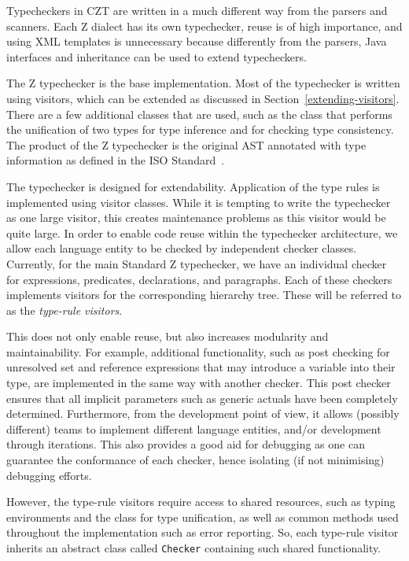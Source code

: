 \documentclass{llncs}
\begin{document}
Typecheckers in CZT are written in a much different way from the parsers
and scanners. Each Z dialect has its own typechecker, reuse
is of high importance, and using XML templates is unnecessary because
differently from the parsers, Java interfaces and inheritance can be used to
extend typecheckers.

The Z typechecker is the base implementation. Most of the typechecker
is written using visitors, which can be extended as discussed in
Section~\ref{extending-visitors}. There are a few additional classes
that are used, such as the class that performs the unification of two
types for type inference and for checking type consistency.
The product of the Z typechecker is the original AST annotated with type
information as defined in the ISO Standard~\cite[Section~10]{isoz}.

The typechecker is designed for extendability. Application of the type
rules is implemented using visitor classes. While it is tempting to
write the typechecker as one large visitor, this creates maintenance
problems as this visitor would be quite large.
In order to enable code reuse within the typechecker architecture, we
allow each language entity to be checked by independent checker classes.
Currently, for the main Standard Z typechecker, we have an individual checker
for expressions, predicates, declarations, and paragraphs. Each of these checkers
implements visitors for the corresponding hierarchy tree.
These will be referred to as the {\em type-rule visitors}.

This does not only enable reuse, but also increases modularity and maintainability.
For example, additional functionality, such as post checking for unresolved set and
reference expressions that may introduce a variable into their type, are implemented in
the same way with another checker. This post checker ensures that all implicit
parameters such as generic actuals have been completely determined.
Furthermore, from the development point of view, it allows (possibly different) teams
to implement different language entities, and/or development through iterations.
This also provides a good aid for debugging as one can guarantee the conformance of each
checker, hence isolating (if not minimising) debugging efforts.

However, the type-rule visitors require access to shared resources,
such as typing environments and the class for type unification, as well as
common methods used throughout the implementation such as error reporting.
So, each type-rule visitor inherits an abstract class called {\tt Checker}
containing such shared functionality.
\end{document}
